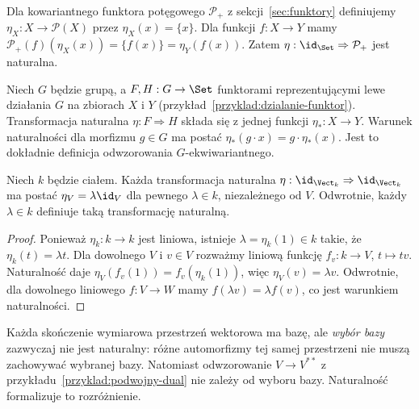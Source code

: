 \begin{przyklad}
Dla kowariantnego funktora potęgowego $\mathcal P_+$ z sekcji~\ref{sec:funktory} definiujemy $\eta_X:X\to\mathcal P(X)$ przez $\eta_X(x)=\{x\}$. Dla funkcji $f:X\to Y$ mamy $\mathcal P_+(f)(\eta_X(x))=\{f(x)\}=\eta_Y(f(x))$. Zatem $\eta:\id_{\Set}\Rightarrow\mathcal P_+$ jest naturalna.
\end{przyklad}

\begin{przyklad}
Niech $G$ będzie grupą, a $F,H:G\to\Set$ funktorami reprezentującymi lewe działania $G$ na zbiorach $X$ i $Y$ (przykład~\ref{przyklad:dzialanie-funktor}). Transformacja naturalna $\eta:F\Rightarrow H$ składa się z jednej funkcji $\eta_*:X\to Y$. Warunek naturalności dla morfizmu $g\in G$ ma postać $\eta_*(g\cdot x)=g\cdot\eta_*(x)$. Jest to dokładnie definicja odwzorowania $G$-ekwiwariantnego.
\end{przyklad}

\begin{twierdzenie}\label{tw:skalarnosc}
Niech $k$ będzie ciałem. Każda transformacja naturalna $\eta:\id_{\Vect_k}\Rightarrow\id_{\Vect_k}$ ma postać $\eta_V=\lambda\id_V$ dla pewnego $\lambda\in k$, niezależnego od $V$. Odwrotnie, każdy $\lambda\in k$ definiuje taką transformację naturalną.
\end{twierdzenie}
\begin{proof}
Ponieważ $\eta_k:k\to k$ jest liniowa, istnieje $\lambda=\eta_k(1)\in k$ takie, że $\eta_k(t)=\lambda t$. Dla dowolnego $V$ i $v\in V$ rozważmy liniową funkcję $f_v:k\to V$, $t\mapsto tv$. Naturalność daje $\eta_V(f_v(1))=f_v(\eta_k(1))$, więc $\eta_V(v)=\lambda v$. Odwrotnie, dla dowolnego liniowego $f:V\to W$ mamy $f(\lambda v)=\lambda f(v)$, co jest warunkiem naturalności.
\end{proof}

\begin{uwaga}
Każda skończenie wymiarowa przestrzeń wektorowa ma bazę, ale \emph{wybór bazy} zazwyczaj nie jest naturalny: różne automorfizmy tej samej przestrzeni nie muszą zachowywać wybranej bazy. Natomiast odwzorowanie $V\to V^{**}$ z przykładu~\ref{przyklad:podwojny-dual} nie zależy od wyboru bazy. Naturalność formalizuje to rozróżnienie.
\end{uwaga}

